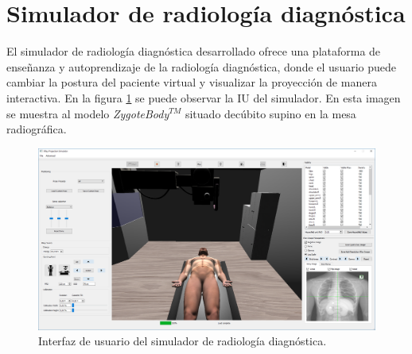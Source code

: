 \clearpage
\section{Simulador de radiología diagnóstica}
\label{result:xray}

El simulador de radiología diagnóstica desarrollado ofrece una plataforma de enseñanza y autoprendizaje de la radiología diagnóstica, donde el usuario puede cambiar la postura del paciente virtual y visualizar la proyección de manera interactiva. 
%
En la figura \ref{fig:simui2} se puede observar la \ac{IU} del simulador. En esta imagen se muestra al modelo \emph{ZygoteBody}$^{TM}$ situado decúbito supino en la mesa radiográfica. 
\begin{figure}[ht]
\centering
\includegraphics[width=0.95\linewidth]{IMG/simui.png}
\caption{\label{fig:simui2} Interfaz de usuario del simulador de radiología diagnóstica. }
\end{figure}


